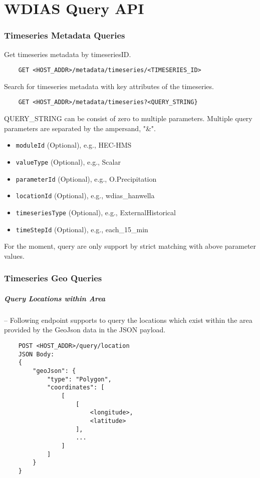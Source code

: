 \chapter{WDIAS Query API}

\subsection{Timeseries Metadata Queries}
Get timeseries metadata by timeseriesID.
\begin{lstlisting}
    GET <HOST_ADDR>/metadata/timeseries/<TIMESERIES_ID>
\end{lstlisting}

Search for timeseries metadata with key attributes of the timeseries.
\begin{lstlisting}
    GET <HOST_ADDR>/metadata/timeseries?<QUERY_STRING}
\end{lstlisting}

QUERY\_STRING can be consist of zero to multiple parameters. Multiple query parameters are separated by the ampersand, "\&".
\begin{itemize}
    \item \texttt{moduleId} (Optional), e.g., HEC-HMS
    \item \texttt{valueType} (Optional), e.g., Scalar
    \item \texttt{parameterId} (Optional), e.g., O.Precipitation
    \item \texttt{locationId} (Optional), e.g., wdias\_hanwella
    \item \texttt{timeseriesType} (Optional), e.g., ExternalHistorical
    \item \texttt{timeStepId} (Optional), e.g., each\_15\_min
\end{itemize}
For the moment, query are only support by strict matching with above parameter values.

\subsection{Timeseries Geo Queries}

\paragraph{Query Locations within Area}-- Following endpoint supports to query the locations which exist within the area provided by the GeoJson data in the JSON payload.
\begin{lstlisting}
    POST <HOST_ADDR>/query/location
    JSON Body:
    {
        "geoJson": {
            "type": "Polygon",
            "coordinates": [
                [
                    [
                        <longitude>,
                        <latitude>
                    ],
                    ...
                ]
            ]
        }
    }
\end{lstlisting}

